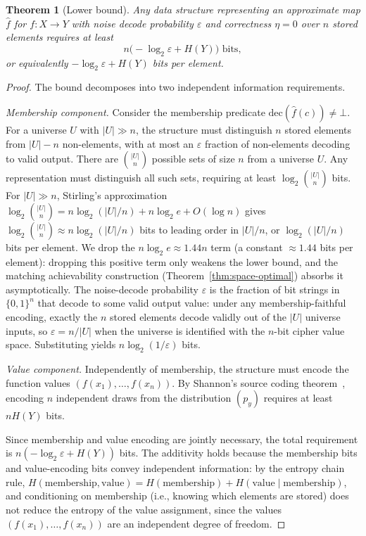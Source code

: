 \documentclass[11pt]{article}
\theoremstyle{definition}
\theoremstyle{plain}
\newtheorem{theorem}{Theorem}[section]
\theoremstyle{remark}
\newcommand{\fhat}{\hat{f}}
\newcommand{\dec}{\mathrm{dec}}
\begin{document}
\begin{theorem}[Lower bound]
\label{thm:lower-bound}
Any data structure representing an approximate map $\fhat$ for
$f : X \to Y$ with noise decode probability $\varepsilon$ and correctness
$\eta = 0$ over $n$ stored elements requires at least
\begin{equation}
n\bigl(-\log_2 \varepsilon + H(Y)\bigr) \text{ bits},
\end{equation}
or equivalently $-\log_2 \varepsilon + H(Y)$ bits per element.
\end{theorem}

\begin{proof}
The bound decomposes into two independent information requirements.

\emph{Membership component.}
Consider the membership predicate $\dec(\fhat(c)) \neq \bot$.  For a
universe $U$ with $|U| \gg n$, the structure must distinguish $n$ stored
elements from $|U|-n$ non-elements, with at most an $\varepsilon$ fraction
of non-elements decoding to valid output.  There are $\binom{|U|}{n}$
possible sets of size $n$ from a universe $U$.  Any representation must
distinguish all such sets, requiring at least $\log_2 \binom{|U|}{n}$
bits.  For $|U| \gg n$, Stirling's approximation
$\log_2 \binom{|U|}{n} = n \log_2(|U|/n) + n \log_2 e + O(\log n)$ gives
$\log_2 \binom{|U|}{n} \approx n \log_2(|U|/n)$ bits to leading order in
$|U|/n$, or $\log_2(|U|/n)$ bits per element.  We drop the $n \log_2 e
\approx 1.44 n$ term (a constant $\approx 1.44$ bits per element):
dropping this positive term only weakens the lower bound, and the
matching achievability construction (Theorem~\ref{thm:space-optimal})
absorbs it asymptotically.  The noise-decode probability
$\varepsilon$ is the fraction of bit strings in $\{0,1\}^n$ that decode to
some valid output value: under any membership-faithful encoding, exactly
the $n$ stored elements decode validly out of the $|U|$ universe inputs,
so $\varepsilon = n / |U|$ when the universe is identified with the
$n$-bit cipher value space.  Substituting yields
$n \log_2(1/\varepsilon)$ bits.

\emph{Value component.}
Independently of membership, the structure must encode the function values
$(f(x_1), \ldots, f(x_n))$.  By Shannon's source coding theorem~\cite{shannon1948mathematical}, encoding
$n$ independent draws from the distribution $(p_y)$ requires at least
$n H(Y)$ bits.

Since membership and value encoding are jointly necessary, the total
requirement is $n(-\log_2 \varepsilon + H(Y))$ bits.  The additivity holds
because the membership bits and value-encoding bits convey independent
information: by the entropy chain rule,
$H(\text{membership}, \text{value}) = H(\text{membership}) + H(\text{value} \mid \text{membership})$,
and conditioning on membership (i.e., knowing which elements are stored) does
not reduce the entropy of the value assignment, since the values
$(f(x_1), \ldots, f(x_n))$ are an independent degree of freedom.
\end{proof}
\end{document}
